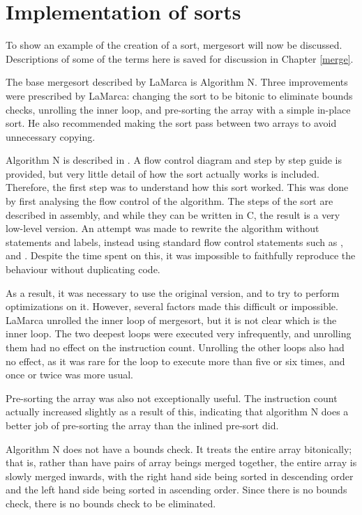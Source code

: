 
\section{Implementation of sorts}

To show an example of the creation of a sort, mergesort will now be discussed.
Descriptions of some of the terms here is saved for discussion in Chapter
\ref{merge}.

The base mergesort described by LaMarca is Algorithm N. Three improvements
were prescribed by LaMarca: changing the sort to be bitonic to eliminate bounds
checks, unrolling the inner loop, and pre-sorting the array with a simple in-place
sort. He also recommended making the sort pass between two arrays to avoid
unnecessary copying.

Algorithm N is described in \cite{Knuth98}. A flow control diagram and step by
step guide is provided, but very little detail of how the sort actually works is
included. Therefore, the first step was to understand how this sort worked. This
was done by first analysing the flow control of the algorithm. The steps of the
sort are described in assembly, and while they can be written in C, the result
is a very low-level version. An attempt was made to rewrite the algorithm
without  statements and labels, instead using standard flow control
statements such as ,  and . Despite the time spent
on this, it was impossible to faithfully reproduce the behaviour without
duplicating code.

As a result, it was necessary to use the original version, and to try to perform
optimizations on it. However, several factors made this difficult or impossible.
LaMarca unrolled the inner loop of mergesort, but it is not clear which is the
inner loop. The two deepest loops were executed very infrequently, and
unrolling them had no effect on the instruction count. Unrolling the other loops
also had no effect, as it was rare for the loop to execute more than five or six
times, and once or twice was more usual.

Pre-sorting the array was also not exceptionally useful. The instruction count
actually increased slightly as a result of this, indicating that algorithm N
does a better job of pre-sorting the array than the inlined pre-sort did.

Algorithm N does not have a bounds check. It treats the entire array
bitonically; that is, rather than have pairs of array beings merged together,
the entire array is slowly merged inwards, with the right hand side being sorted
in descending order and the left hand side being sorted in ascending order.
Since there is no bounds check, there is no bounds check to be eliminated.

